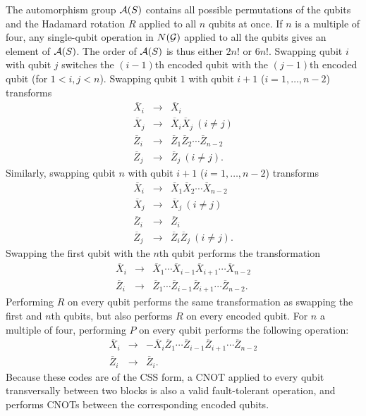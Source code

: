\documentclass{report}
\newcommand{\G}{{\cal G}}
\newcommand{\Xbar}{\overline{X}}
\newcommand{\Zbar}{\overline{Z}}
\newcommand{\A}{{\cal A}}
\begin{document}
The automorphism group $\A(S)$ contains all possible 
permutations of the qubits and the Hadamard rotation $R$ applied to all 
$n$ qubits at once.  If $n$ is a multiple of four, any single-qubit operation 
in $N(\G)$ applied to all the qubits gives an element of $\A(S)$.  The order of 
$\A(S)$ is thus either $2 n!$ or $6 n!$.  Swapping qubit $i$ with qubit $j$ 
switches the $(i-1)$th encoded qubit with the $(j-1)$th encoded qubit (for 
$1 < i, j < n$).  Swapping qubit $1$ with qubit $i+1$ ($i =1, \ldots, n-2$) 
transforms
\begin{eqnarray}
\Xbar_i & \rightarrow & \Xbar_i \nonumber \\
\Xbar_j & \rightarrow & \Xbar_i \Xbar_j\ (i \neq j) \nonumber \\
\Zbar_i & \rightarrow & \Zbar_1 \Zbar_2 \cdots \Zbar_{n-2} \\
\Zbar_j & \rightarrow & \Zbar_j\ (i \neq j). \nonumber
\end{eqnarray}
Similarly, swapping qubit $n$ with qubit $i+1$ ($i = 1, \ldots, n-2$) 
transforms
\begin{eqnarray}
\Xbar_i & \rightarrow & \Xbar_1 \Xbar_2 \cdots \Xbar_{n-2} \nonumber \\
\Xbar_j & \rightarrow & \Xbar_j\ (i \neq j) \nonumber \\
\Zbar_i & \rightarrow & \Zbar_i \\
\Zbar_j & \rightarrow & \Zbar_i \Zbar_j\ (i \neq j). \nonumber
\end{eqnarray}
Swapping the first qubit with the $n$th qubit performs the transformation
\begin{eqnarray}
\Xbar_i & \rightarrow & \Xbar_1 \cdots \Xbar_{i-1} \Xbar_{i+1} \cdots 
\Xbar_{n-2} \nonumber \\
\Zbar_i & \rightarrow & \Zbar_1 \cdots \Zbar_{i-1} \Zbar_{i+1} \cdots 
\Zbar_{n-2}.
\end{eqnarray}
Performing $R$ on every qubit performs the same transformation as 
swapping the first and $n$th qubits, but also performs $R$ on every 
encoded qubit.  For $n$ a multiple of four, performing $P$ on every qubit 
performs the following operation:
\begin{eqnarray}
\Xbar_i & \rightarrow & - \Xbar_i \Zbar_1 \cdots \Zbar_{i-1} \Zbar_{i+1} 
\cdots \Zbar_{n-2} \nonumber \\
\Zbar_i & \rightarrow & \Zbar_i.
\end{eqnarray}
Because these codes are of the CSS form, a CNOT applied to every qubit 
transversally between two blocks is also a valid fault-tolerant operation, 
and performs CNOTs between the corresponding encoded qubits.  
\end{document}
